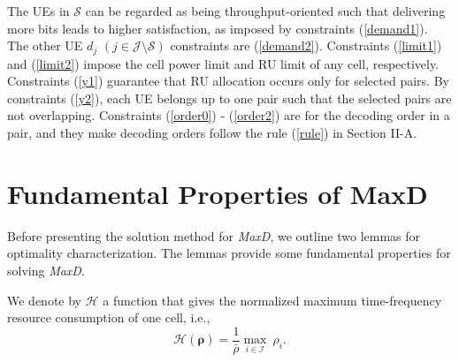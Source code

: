 \documentclass[10pt,journal,final,finalsubmission,twocolumn]{IEEEtran}
\begin{document}
The UEs in $\mathcal{S}$ can be regarded as being throughput-oriented such that delivering more bits leads to higher satisfaction, as imposed by constraints (\ref{demand1}). The other UE $d_j$ $(j \!\in \!\mathcal{J} \!\setminus\mathcal{S})$ constraints are (\ref{demand2}). Constraints (\ref{limit1}) and (\ref{limit2}) impose the cell power limit and RU limit of any cell, respectively. Constraints (\ref{y1}) guarantee that RU allocation occurs only for selected pairs. By constraints (\ref{y2}), each UE belongs up to one pair such that the selected pairs are not overlapping. Constraints (\ref{order0}) - (\ref{order2}) are for the decoding order in a pair, and they make decoding orders follow the rule (\ref{rule}) in Section II-A. 



\section{Fundamental Properties of MaxD} \label{Sec:properties}

Before presenting the solution method for {\em MaxD}, we outline two lemmas for optimality characterization. The lemmas provide some fundamental properties for solving {\em MaxD}. 


We denote by $\mathcal{H}$ a function that gives the normalized maximum time-frequency resource consumption of one cell, i.e.,
\begin{equation}
\mathcal{H}(\boldsymbol{\rho}) = \frac{1}{\bar{\rho}}\underset{i\in \mathcal{I}}{\max} \ \rho_i.
\end{equation}
\end{document}

